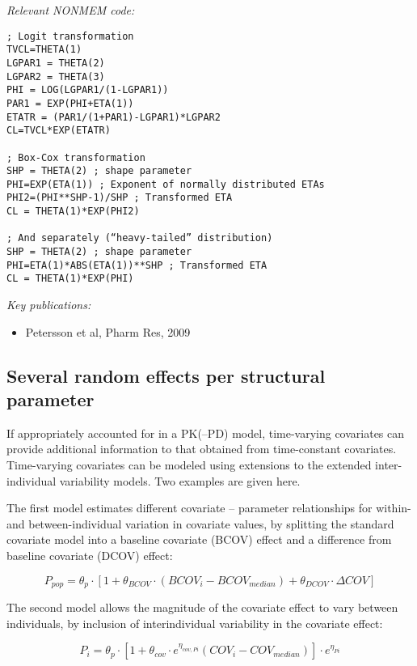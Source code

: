 \documentclass[a4paper,11pt]{article}
\begin{document}
\vspace{10pt}

\noindent \emph{Relevant NONMEM code:}
\begin{lstlisting}
; Logit transformation
TVCL=THETA(1)
LGPAR1 = THETA(2)
LGPAR2 = THETA(3)
PHI = LOG(LGPAR1/(1-LGPAR1))
PAR1 = EXP(PHI+ETA(1))
ETATR = (PAR1/(1+PAR1)-LGPAR1)*LGPAR2
CL=TVCL*EXP(ETATR)

; Box-Cox transformation
SHP = THETA(2) ; shape parameter
PHI=EXP(ETA(1)) ; Exponent of normally distributed ETAs
PHI2=(PHI**SHP-1)/SHP ; Transformed ETA
CL = THETA(1)*EXP(PHI2)

; And separately (“heavy-tailed” distribution)
SHP = THETA(2) ; shape parameter
PHI=ETA(1)*ABS(ETA(1))**SHP ; Transformed ETA
CL = THETA(1)*EXP(PHI)
\end{lstlisting}

\noindent \emph{Key publications:}
\begin{itemize}
\item Petersson et al, Pharm Res, 2009
\end{itemize}

\subsection{Several random effects per structural parameter}
If appropriately accounted for in a PK(–PD) model, time-varying
covariates can provide additional information to that obtained from
time-constant covariates. Time-varying covariates can be modeled using
extensions to the extended inter-individual variability models. Two
examples are given here.

The first model estimates different covariate -- parameter relationships for within- and
between-individual variation in covariate values, by splitting the standard covariate
model into a baseline covariate (BCOV) effect and a difference from baseline
covariate (DCOV) effect:

\begin{equation}
P_{pop} = \theta_p \cdot \left[ 1 + \theta_{BCOV} \cdot (BCOV_i - BCOV_{median}) + \theta_{DCOV} \cdot \Delta COV \right]
\end{equation}

The second model allows the magnitude of the covariate effect to vary
between individuals, by inclusion of interindividual variability in
the covariate effect:

\begin{equation}
P_i = \theta_p \cdot \left[ 1 + \theta_{cov} \cdot e^{\eta_{cov,Pi}} (COV_i-COV_{median} ) \right] \cdot e^{\eta_{Pi}}
\end{equation}
\end{document}
